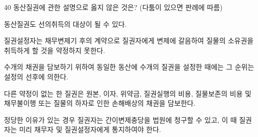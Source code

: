 \begin{question}{40}
동산질권에 관한 설명으로 옳지 않은 것은? (다툼이 있으면 판례에 따름)
\begin{choices}
  \item 동산질권도 선의취득의 대상이 될 수 있다.
  \item 질권설정자는 채무변제기 후의 계약으로 질권자에게 변제에 갈음하여 질물의 소유권을 취득하게 할 것을 약정하지 못한다.
  \item 수개의 채권을 담보하기 위하여 동일한 동산에 수개의 질권을 설정한 때에는 그 순위는 설정의 선후에 의한다.
  \item 다른 약정이 없는 한 질권은 원본, 이자, 위약금, 질권실행의 비용, 질물보존의 비용 및 채무불이행 또는 질물의 하자로 인한 손해배상의 채권을 담보한다.
  \item 정당한 이유가 있는 경우 질권자는 간이변제충당을 법원에 청구할 수 있고, 이 때 질권자는 미리 채무자 및 질권설정자에게 통지하여야 한다.
\end{choices}
\end{question}
